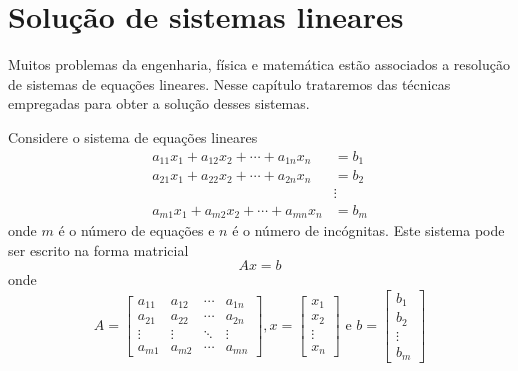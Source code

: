 
%

\chapter{Solução de sistemas lineares}

Muitos problemas da engenharia, física e matemática estão associados a resolução de sistemas de equações lineares. Nesse capítulo trataremos das técnicas empregadas para obter a solução desses sistemas. 


Considere o sistema de equações lineares
\begin{align*}
a_{11}x_1 + a_{12}x_2 + \cdots +a_{1n}x_n &= b_1\\
a_{21}x_1 + a_{22}x_2 + \cdots +a_{2n}x_n &= b_2\\
                                          &\vdots \\
a_{m1}x_1 + a_{m2}x_2 + \cdots +a_{mn}x_n &= b_m
\end{align*}
onde $m$ é o número de equações e $n$ é o número de incógnitas.  Este sistema pode ser escrito na forma matricial
$$Ax=b$$
onde
$$A=\begin{bmatrix}
a_{11} & a_{12} & \cdots & a_{1n}\\
a_{21} & a_{22} & \cdots & a_{2n}\\
\vdots & \vdots & \ddots & \vdots\\
a_{m1} & a_{m2} & \cdots & a_{mn}
\end{bmatrix},
x=\begin{bmatrix}
x_{1} \\
x_{2} \\
\vdots \\
x_{n}
\end{bmatrix}
 \text{ e } b=\begin{bmatrix}
b_{1} \\
b_{2} \\
\vdots \\
b_{m}
\end{bmatrix}
$$




